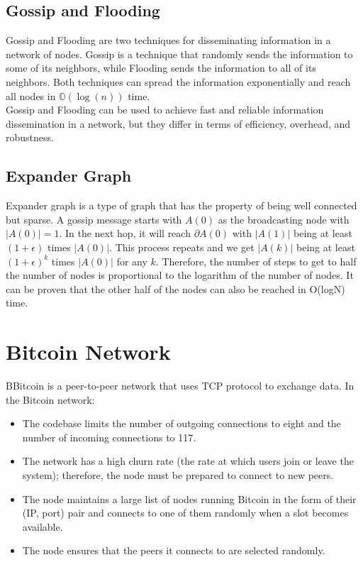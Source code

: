 \subsection{Gossip and Flooding}
Gossip and Flooding are two techniques for disseminating information in a network of nodes. Gossip is a technique that randomly sends the information to some of its neighbors, while Flooding sends the information to all of its neighbors. Both techniques can spread the information exponentially and reach all nodes in $\mathbb{O}(\log(n))$ time.\\
Gossip and Flooding can be used to achieve fast and reliable information dissemination in a network, but they differ in terms of efficiency, overhead, and robustness.
\subsection{Expander Graph}
Expander graph is a type of graph that has the property of being well connected but sparse. 
A gossip message starts with $A(0)$ as the broadcasting node with $|A(0)| = 1$. In the next hop, it will reach $\partial A(0)$ with $|A(1)|$ being at least $(1 + \epsilon)$ times $|A(0)|$. This process repeats and we get $|A(k)|$ being at least $(1 + \epsilon)^k$ times $|A(0)|$ for any $k$. Therefore, the number of steps to get to half the number of nodes is proportional to the logarithm of the number of nodes. It can be proven that the other half of the nodes can also be reached in O(logN) time.

\section{Bitcoin Network}
BBitcoin is a peer-to-peer network that uses TCP protocol to exchange data. In the Bitcoin network:
\begin{itemize}
    \item The codebase limits the number of outgoing connections to eight and the number of incoming connections to 117.
    \item The network has a high churn rate (the rate at which users join or leave the system); therefore, the node must be prepared to connect to new peers.
    \item The node maintains a large list of nodes running Bitcoin in the form of their (IP, port) pair and connects to one of them randomly when a slot becomes available.
    \item The node ensures that the peers it connects to are selected randomly.
\end{itemize}
